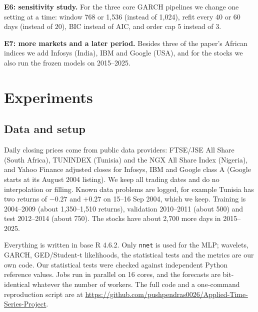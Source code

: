 \documentclass{article}
\begin{document}
\textbf{E6: sensitivity study.} For the three core GARCH pipelines we change one setting at a time: window 768 or 1,536 (instead of 1,024), refit every 40 or 60 days (instead of 20), BIC instead of AIC, and order cap 5 instead of 3.

\textbf{E7: more markets and a later period.} Besides three of the paper's African indices we add Infosys (India), IBM and Google (USA), and for the stocks we also run the frozen models on 2015--2025.

\section{Experiments}
\label{sec:exp}

\subsection{Data and setup}

Daily closing prices come from public data providers: FTSE/JSE All Share (South Africa), TUNINDEX (Tunisia) and the NGX All Share Index (Nigeria), and Yahoo Finance adjusted closes for Infosys, IBM and Google class A (Google starts at its August 2004 listing). We keep all trading dates and do no interpolation or filling. Known data problems are logged, for example Tunisia has two returns of $-0.27$ and $+0.27$ on 15--16 Sep 2004, which we keep. Training is 2004--2009 (about 1,350--1,510 returns), validation 2010--2011 (about 500) and test 2012--2014 (about 750). The stocks have about 2,700 more days in 2015--2025.

Everything is written in base R 4.6.2. Only \texttt{nnet} is used for the MLP; wavelets, GARCH, GED/Student-t likelihoods, the statistical tests and the metrics are our own code. Our statistical tests were checked against independent Python reference values. Jobs run in parallel on 16 cores, and the forecasts are bit-identical whatever the number of workers. The full code and a one-command reproduction script are at \url{https://github.com/pushpendras0026/Applied-Time-Series-Project}.
\end{document}
